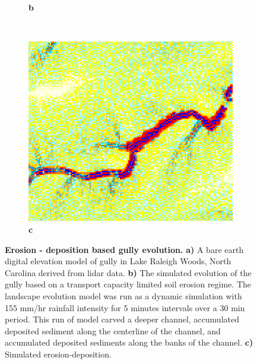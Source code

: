 \documentclass[10pt,letterpaper]{article}
\begin{document}
\begin{figure}
\begin{subfigure}[b]{0.3\textwidth}
\label{fig_2_2}
\textbf{b} \\
\end{subfigure}
%
~ %
%
\begin{subfigure}[b]{0.3\textwidth}
\includegraphics[width=\textwidth]{images/lrwoods_dynamics_erdep_5m_30m_erdep.png} %
\label{fig_2_3}
\textbf{c} \\
\end{subfigure}
%
\caption{{\bf Erosion - deposition based gully evolution.}
\textbf{a)}
A bare earth digital elevation model of gully in Lake Raleigh Woods, North Carolina derived from lidar data.
\textbf{b)}
The simulated evolution of the gully based on a transport capacity limited  soil erosion regime.
The landscape evolution model was run as a dynamic simulation with 155 mm/hr rainfall intensity for 5 minutes intervals over a 30 min period.
This run of model carved a deeper channel, accumulated deposited sediment along the centerline of the channel, and accumulated deposited sediments along the banks of the channel.
\textbf{c)}
Simulated erosion-deposition. 
}
\label{fig_1}
\end{figure}
\end{document}

